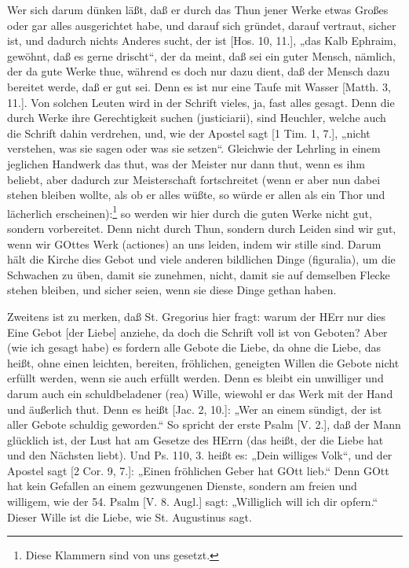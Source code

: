 Wer sich darum dünken läßt, daß er durch das Thun jener Werke etwas Großes oder gar alles ausgerichtet habe, und darauf sich gründet, darauf vertraut, sicher ist, und dadurch nichts Anderes sucht, der ist [Hos. 10, 11.], „das Kalb Ephraim, gewöhnt, daß es gerne drischt“, der
da meint, daß sei ein guter Mensch, nämlich, der da gute Werke thue, während es doch nur dazu dient, daß der Mensch dazu bereitet werde, daß er gut sei. Denn es ist nur eine Taufe mit Wasser [Matth. 3, 11.]. Von solchen Leuten wird in der Schrift vieles, ja, fast alles gesagt. Denn die durch Werke ihre Gerechtigkeit suchen (justiciarii), sind Heuchler, welche auch die Schrift dahin verdrehen, und, wie der Apostel sagt [1 Tim. 1, 7.], „nicht verstehen, was sie sagen oder was sie setzen“. Gleichwie der Lehrling in einem jeglichen Handwerk das thut, was der Meister nur dann thut, wenn es ihm beliebt, aber dadurch zur Meisterschaft fortschreitet (wenn er aber nun dabei stehen bleiben wollte, als ob er alles wüßte, so würde er allen als ein Thor und lächerlich erscheinen):\footnote{Diese Klammern sind von uns gesetzt.} so werden wir hier durch die guten Werke nicht gut, sondern vorbereitet. Denn nicht durch Thun, sondern durch Leiden sind wir gut, wenn wir GOttes Werk (actiones) an uns leiden, indem wir stille sind. Darum hält die Kirche dies Gebot und viele anderen bildlichen Dinge (figuralia), um die Schwachen zu üben, damit sie zunehmen, nicht, damit sie auf demselben Flecke stehen bleiben, und sicher seien, wenn sie diese Dinge gethan haben.

Zweitens ist zu merken, daß St. Gregorius hier fragt: warum der HErr nur dies Eine Gebot [der Liebe] anziehe, da doch die Schrift voll ist von Geboten? Aber (wie ich gesagt habe) es fordern alle Gebote die Liebe, da ohne die Liebe, das heißt, ohne einen leichten, bereiten, fröhlichen, geneigten Willen die Gebote nicht erfüllt werden, wenn sie auch erfüllt werden. Denn es bleibt ein unwilliger und darum auch ein schuldbeladener (rea) Wille, wiewohl er das Werk mit der Hand und äußerlich thut. Denn es heißt [Jac. 2, 10.]: „Wer an einem sündigt, der ist aller Gebote schuldig geworden.“ So spricht der erste Psalm [V. 2.], daß der Mann glücklich ist, der Lust hat am Gesetze des HErrn (das heißt, der die Liebe hat und den Nächsten liebt). Und Ps. 110, 3. heißt es: „Dein williges Volk“, und der Apostel sagt [2 Cor. 9, 7.]: „Einen fröhlichen Geber hat GOtt lieb.“ Denn GOtt hat kein Gefallen an einem gezwungenen Dienste, sondern am freien und willigem, wie der 54. Psalm [V. 8. Augl.] sagt: „Williglich will ich dir opfern.“ Dieser Wille ist die Liebe, wie St. Augustinus sagt.

